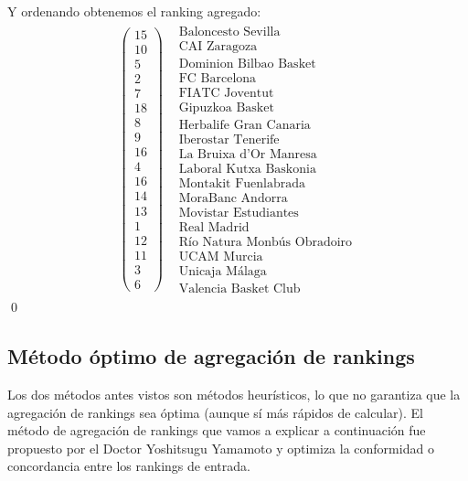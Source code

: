 Y ordenando obtenemos el ranking agregado:\\
\[
\begin{array}{cc}
\left(\begin{array}{c}
15\\
10\\
5\\
2\\
7\\
18\\
8\\
9\\
16\\
4\\
16\\
14\\
13\\
1\\
12\\
11\\
3\\
6
\end{array} \right) & \begin{array}{c}
\text{Baloncesto Sevilla}\\
\text{CAI Zaragoza} \\
\text{Dominion Bilbao Basket} \\
\text{FC Barcelona} \\
\text{FIATC Joventut} \\
\text{Gipuzkoa Basket} \\
\text{Herbalife Gran Canaria} \\
\text{Iberostar Tenerife} \\
\text{La Bruixa d'Or Manresa} \\
\text{Laboral Kutxa Baskonia} \\
\text{Montakit Fuenlabrada} \\
\text{MoraBanc Andorra} \\
\text{Movistar Estudiantes} \\
\text{Real Madrid} \\
\text{Río Natura Monbús Obradoiro} \\
\text{UCAM Murcia} \\
\text{Unicaja Málaga} \\
\text{Valencia Basket Club}
\end{array} 
\end{array} 
\]
\qed


\subsection{Método óptimo de agregación de rankings}
Los dos métodos antes vistos son métodos heurísticos, lo que no garantiza que la agregación de rankings sea óptima (aunque sí más rápidos de calcular). El método de agregación de rankings que vamos a explicar a continuación fue propuesto por el Doctor Yoshitsugu Yamamoto y optimiza la conformidad o concordancia entre los rankings de entrada.\\

